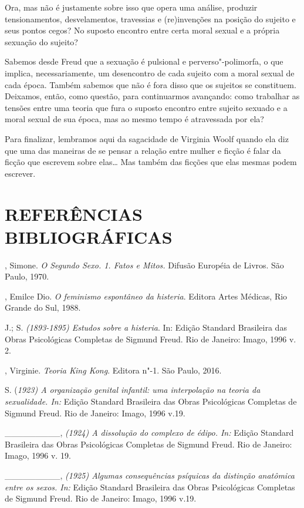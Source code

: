 Ora, mas não é justamente sobre isso que opera uma análise, produzir
tensionamentos, desvelamentos, travessias e (re)invenções na posição do
sujeito e seus pontos cegos? No suposto encontro entre certa moral
sexual e a própria sexuação do sujeito?

Sabemos desde Freud que a sexuação é pulsional e perverso"-polimorfa, o
que implica, necessariamente, um desencontro de cada sujeito com a moral
sexual de cada época. Também sabemos que não é fora disso que os
sujeitos se constituem. Deixamos, então, como questão, para continuarmos
avançando: como trabalhar as tensões entre uma teoria que fura o suposto
encontro entre sujeito sexuado e a moral sexual de sua época, mas ao
mesmo tempo é atravessada por ela?

Para finalizar, lembramos aqui da sagacidade de Virginia Woolf quando
ela diz que uma das maneiras de se pensar a relação entre mulher e
ficção é falar da ficção que escrevem sobre elas\ldots{} Mas também das
ficções que elas mesmas podem escrever.

\section{REFERÊNCIAS BIBLIOGRÁFICAS}

, Simone. \emph{O Segundo Sexo. 1. Fatos e Mitos.} Difusão
Européia de Livros. São Paulo, 1970.

, Emilce Dio. \emph{O feminismo espontâneo da histeria}.
Editora Artes Médicas, Rio Grande do Sul, 1988.

 J.;  S. \emph{(1893-1895) Estudos sobre a histeria}. In:
Edição Standard Brasileira das Obras Psicológicas Completas de Sigmund
Freud. Rio de Janeiro: Imago, 1996 v. 2.

, Virginie. \emph{Teoria King Kong}. Editora n"-1. São Paulo,
2016.

 S. (\emph{1923) A organização genital infantil: uma interpolação
na teoria da sexualidade. In:} Edição Standard Brasileira das Obras
Psicológicas Completas de Sigmund Freud. Rio de Janeiro: Imago, 1996
v.19.

\_\_\_\_\_\_\_\_\_, \emph{(1924) A dissolução do complexo de édipo. In:}
Edição Standard Brasileira das Obras Psicológicas Completas de Sigmund
Freud. Rio de Janeiro: Imago, 1996 v. 19.

\_\_\_\_\_\_\_\_\_, \emph{(1925) Algumas consequências psíquicas da
distinção anatômica entre os sexos. In:} Edição Standard Brasileira das
Obras Psicológicas Completas de Sigmund Freud. Rio de Janeiro: Imago,
1996 v.19.

